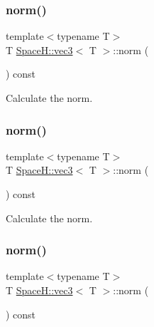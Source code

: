 \subsubsection{\texorpdfstring{norm()}{norm()}\hspace{0.1cm}{\footnotesize\ttfamily [2/4]}}
{\footnotesize\ttfamily template$<$typename T$>$ \\
T \mbox{\hyperlink{struct_space_h_1_1vec3}{Space\+H\+::vec3}}$<$ T $>$\+::norm (\begin{DoxyParamCaption}{ }\end{DoxyParamCaption}) const\hspace{0.3cm}{\ttfamily [inline]}}



Calculate the norm. 

\mbox{\label{struct_space_h_1_1vec3_aeec869b0802a468ffff325efb2d0e780}} 
\subsubsection{\texorpdfstring{norm()}{norm()}\hspace{0.1cm}{\footnotesize\ttfamily [3/4]}}
{\footnotesize\ttfamily template$<$typename T$>$ \\
T \mbox{\hyperlink{struct_space_h_1_1vec3}{Space\+H\+::vec3}}$<$ T $>$\+::norm (\begin{DoxyParamCaption}{ }\end{DoxyParamCaption}) const\hspace{0.3cm}{\ttfamily [inline]}}



Calculate the norm. 

\mbox{\label{struct_space_h_1_1vec3_aeec869b0802a468ffff325efb2d0e780}} 
\subsubsection{\texorpdfstring{norm()}{norm()}\hspace{0.1cm}{\footnotesize\ttfamily [4/4]}}
{\footnotesize\ttfamily template$<$typename T$>$ \\
T \mbox{\hyperlink{struct_space_h_1_1vec3}{Space\+H\+::vec3}}$<$ T $>$\+::norm (\begin{DoxyParamCaption}{ }\end{DoxyParamCaption}) const\hspace{0.3cm}{\ttfamily [inline]}}



